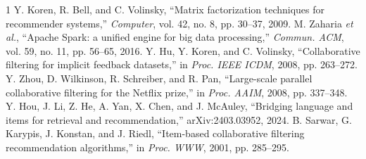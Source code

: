 \documentclass[conference]{IEEEtran}
\begin{document}
\begin{thebibliography}{1}
 Y. Koren, R. Bell, and C. Volinsky, ``Matrix factorization techniques
for recommender systems,'' \emph{Computer}, vol. 42, no. 8, pp. 30--37, 2009.
 M. Zaharia \emph{et al.}, ``Apache Spark: a unified engine for big
data processing,'' \emph{Commun. ACM}, vol. 59, no. 11, pp. 56--65, 2016.
 Y. Hu, Y. Koren, and C. Volinsky, ``Collaborative filtering for implicit
feedback datasets,'' in \emph{Proc. IEEE ICDM}, 2008, pp. 263--272.
 Y. Zhou, D. Wilkinson, R. Schreiber, and R. Pan, ``Large-scale parallel
collaborative filtering for the Netflix prize,'' in \emph{Proc. AAIM}, 2008, pp. 337--348.
 Y. Hou, J. Li, Z. He, A. Yan, X. Chen, and J. McAuley, ``Bridging
language and items for retrieval and recommendation,'' arXiv:2403.03952, 2024.
 B. Sarwar, G. Karypis, J. Konstan, and J. Riedl, ``Item-based
collaborative filtering recommendation algorithms,'' in \emph{Proc. WWW}, 2001,
pp. 285--295.
\end{thebibliography}
\end{document}
